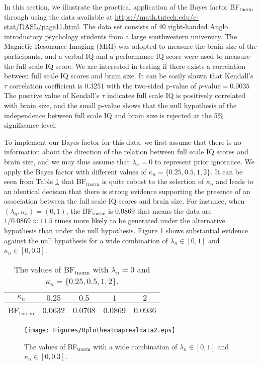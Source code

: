 \documentclass[11pt]{article}
\begin{document}
In this section, we illustrate the practical application of the Bayes factor BF$_\mathrm{tnorm}$ through using the data available at \href{https://math.tntech.edu/e-stat/DASL/page11.html}{https://math.tntech.edu/e-stat/DASL/page11.html}. The data set consists of 40 right-handed Anglo introductory psychology students from a large southwestern university. The Magnetic Resonance Imaging (MRI) was adopted to measure the brain size of the participants, and a verbal IQ and a performance IQ score were used to measure the full scale IQ score. We are interested in testing if there exists a correlation between full scale IQ scores and brain size. It can be easily shown that Kendall's  $\tau$ correlation coefficient is 0.3251 with the two-sided p-value of $ p\text{-value} = 0.0035$ The positive value of Kendall's $\tau$ indicates full scale IQ is positively correlated with brain size, and the small p-value shows that the null hypothesis of the independence between full scale IQ and brain size is rejected at the 5\% significance level.

To implement our Bayes factor for this data, we first assume that there is no information about the direction of the relation between full scale IQ scores and brain size, and we may thus assume that $\lambda_n = 0$ to represent prior ignorance. We apply the Bayes factor with different values of $\kappa_n= \{0.25, 0.5, 1, 2\}$. It can be seen from Table \ref{table:bf} that BF$_\mathrm{tnorm}$ is quite robust to the selection of $\kappa_n$ and leads to an identical decision that there is strong evidence supporting the presence of an association between the full scale IQ scores and brain size. For instance, when $(\lambda_n, \kappa_n) = (0, 1)$, the BF$_\mathrm{tnorm}$ is 0.0869 that means the data are $1/0.0869 \approx  11.5$ times more likely to be generated under the alternative hypothesis than under the null hypothesis. Figure \ref{fig:Rplotheatmaprealdata} shows substantial evidence against the null hypothesis for a wide combination of $\lambda_n \in [0, 1]$ and $\kappa_n \in [0, 0.3]$.

{
\begin{table}[h!]
    \centering
    \begin{tabular}{ccccc}
  \hline
 $\kappa_n$ & $0.25 $  & $0.5$ & $1$ &  $2$ \\ \hline
 BF$_{\mathrm{tnorm}}$  & 0.0632  & 0.0708 & 0.0869 & 0.0936\\ \hline  %
\end{tabular}
    \caption{The values of BF$_\mathrm{tnorm}$ with $\lambda_n = 0$ and $\kappa_n = \{ 0.25, 0.5, 1, 2\}$.}
    \label{table:bf}
\end{table}

\begin{figure}[!t]
    \centering
    \texttt{[image: Figures/Rplotheatmaprealdata2.eps]}
    \caption{The values of BF$_\mathrm{tnorm}$ with a wide combination of $\lambda_n \in [0, 1]$ and $\kappa_n \in [0, 0.3]$.}
    \label{fig:Rplotheatmaprealdata}
\end{figure}
}
\end{document}
